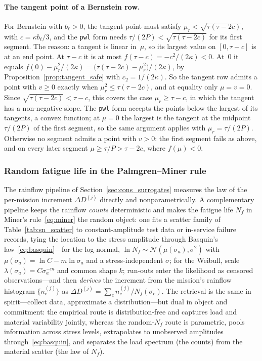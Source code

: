 \documentclass[11pt,a4paper]{article}
\theoremstyle{plain}
\theoremstyle{definition}
\theoremstyle{remark}
\begin{document}
\paragraph{The tangent point of a Bernstein row.}
For Bernstein with $b_\ell > 0$, the tangent point must satisfy $\mu_r < \sqrt{\tau(\tau - 2c)}$, with $c = \kappa b_\ell/3$, and the \texttt{pwl} form needs $\tau/(2P) < \sqrt{\tau(\tau - 2c)}$ for its first segment.
The reason: a tangent is linear in~$\mu$, so its largest value on $[0, \tau - c]$ is at an end point.
At $\tau - c$ it is at most $f(\tau - c) = -c^2/(2\kappa) < 0$.
At~$0$ it equals $f(0) - \mu_r^2/(2\kappa) = \bigl(\tau(\tau - 2c) - \mu_r^2\bigr)/(2\kappa)$, by Proposition~\ref{prop:tangent_safe} with $c_2 = 1/(2\kappa)$.
So the tangent row admits a point with $v \ge 0$ exactly when $\mu_r^2 \le \tau(\tau - 2c)$, and at equality only $\mu = v = 0$.
Since $\sqrt{\tau(\tau - 2c)} < \tau - c$, this covers the case $\mu_r \ge \tau - c$, in which the tangent has a non-negative slope.
The \texttt{pwl} form accepts the points below the largest of its tangents, a convex function; at $\mu = 0$ the largest is the tangent at the midpoint $\tau/(2P)$ of the first segment, so the same argument applies with $\mu_r = \tau/(2P)$.
Otherwise no segment admits a point with $v > 0$: the first segment fails as above, and on every later segment $\mu \ge \tau/P > \tau - 2c$, where $f(\mu) < 0$.

\subsubsection{Random fatigue life in the Palmgren--Miner rule}
\label{sec:miner_randomN}

The rainflow pipeline of Section~\ref{sec:cons_surrogates} measures the law of the per-mission increment $\Delta D^{(j)}$ directly and nonparametrically.
A complementary pipeline keeps the rainflow \emph{counts} deterministic and makes the fatigue life $N_f$ in Miner's rule~\eqref{eq:miner} the random object: one fits a scatter family of Table~\ref{tab:sn_scatter} to constant-amplitude test data or in-service failure records, tying the location to the stress amplitude through Basquin's law~\eqref{eq:basquin}---for the log-normal, $\ln N_f \sim \mathcal{N}(\mu(\sigma_a),\sigma^2)$ with $\mu(\sigma_a) = \ln C - m \ln \sigma_a$ and a stress-independent $\sigma$; for the Weibull, scale $\lambda(\sigma_a) = C\sigma_a^{-m}$ and common shape $k$; run-outs enter the likelihood as censored observations---and then \emph{derives} the increment from the mission's rainflow histogram $\{n^{(j)}_c\}$ as $\Delta D^{(j)} = \sum_c n^{(j)}_c / N_f(\sigma_c)$.
The retrieval is the same in spirit---collect data, approximate a distribution---but dual in object and commitment: the empirical route is distribution-free and captures load and material variability jointly, whereas the random-$N_f$ route is parametric, pools information across stress levels, extrapolates to unobserved amplitudes through~\eqref{eq:basquin}, and separates the load spectrum (the counts) from the material scatter (the law of $N_f$).
\end{document}
